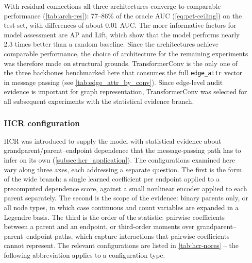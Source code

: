     With residual connections all three architectures converge to comparable
    performance (\cref{tab:arch-res}): 77--86\% of the oracle AUC
    (\cref{eq:pct-ceiling}) on the test
    set, with differences of about 0.01 AUC. The more informative factors for model assessment are AP and 
    Lift, which show that the model performs nearly 2.3 times better than a random baseline. 
    Since the architectures achieve comparable performance, the choice of architecture
    for 
    the remaining experiments 
    was therefore made on structural grounds. TransformerConv is the only one of the three
    backbones benchmarked here that consumes the full \texttt{edge\_attr} vector in message
    passing (see \cref{tab:edge_attr_by_conv}).
    Since edge-level audit evidence is important for graph representation, 
    TransformerConv was
    selected for all subsequent experiments with the statistical evidence branch.

\subsubsection{HCR configuration}

HCR was introduced to supply the model with statistical evidence about
grandparent/parent--endpoint dependence that the message-passing path has to infer on
its own (\cref{subsec:hcr_application}). The configurations examined here
vary along three axes, each addressing a separate question. The first is the
form of the wide branch: a single learned coefficient per endpoint applied
to a precomputed dependence score, against a small nonlinear encoder applied
to each parent separately. The second is the scope of the evidence: binary
parents only, or all node types, in which case continuous and count
variables are expanded in a Legendre basis. The third is the order of the
statistic: pairwise coefficients between a parent and an endpoint, or
third-order moments over grandparent--parent--endpoint paths, which capture
interactions that pairwise coefficients cannot represent. The relevant 
configurations are listed in \cref{tab:hcr-nores} -- the following abbreviation applies
to a configuration type.

